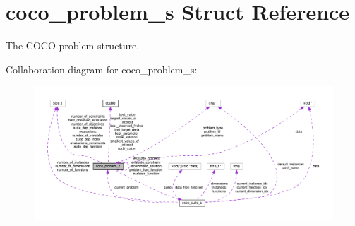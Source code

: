 \hypertarget{structcoco__problem__s}{}\section{coco\+\_\+problem\+\_\+s Struct Reference}
\label{structcoco__problem__s}


The C\+O\+CO problem structure.  




Collaboration diagram for coco\+\_\+problem\+\_\+s\+:\nopagebreak
\begin{figure}[H]
\begin{center}
\leavevmode
\includegraphics[width=350pt]{structcoco__problem__s__coll__graph}
\end{center}
\end{figure}
